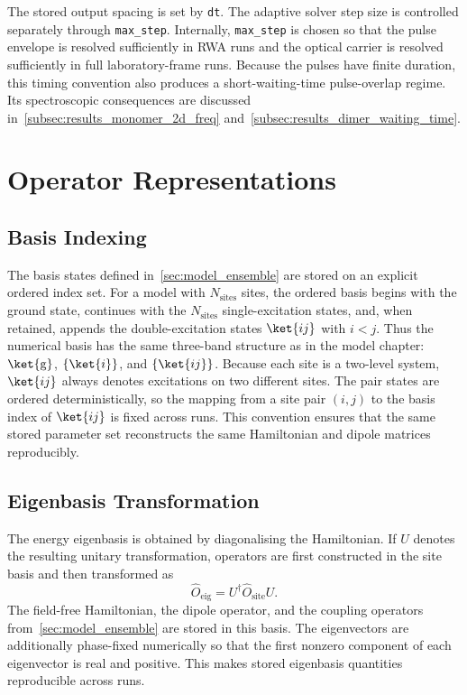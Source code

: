 The stored output spacing is set by \texttt{dt}. The adaptive solver step size
is controlled separately through \texttt{max\_step}. Internally,
\texttt{max\_step} is chosen so that the pulse envelope is resolved
sufficiently in RWA runs and the optical carrier is resolved sufficiently in
full laboratory-frame runs. Because the pulses have finite duration, this
timing convention also produces a short-waiting-time pulse-overlap regime. Its
spectroscopic consequences are discussed
in~\autoref{subsec:results_monomer_2d_freq}
and~\autoref{subsec:results_dimer_waiting_time}.

\section{Operator Representations}
\label{app:sec:model_systems}

\subsection{Basis Indexing}

The basis states defined in~\autoref{sec:model_ensemble} are stored on an
explicit ordered index set. For a model with \(N_{\mathrm{sites}}\) sites, the
ordered basis begins with the ground state, continues with the
\(N_{\mathrm{sites}}\) single-excitation states, and, when retained, appends
the double-excitation states \(\ket{ij}\) with \(i<j\). Thus the numerical
basis has the same three-band structure as in the model chapter:
\(\ket{\mathrm{g}}\), \(\{\ket{i}\}\), and \(\{\ket{ij}\}\). Because each site is a
two-level system, \(\ket{ij}\) always denotes excitations on two different
sites. The pair states are ordered deterministically, so the mapping from a
site pair \((i,j)\) to the basis index of \(\ket{ij}\) is fixed across runs.
This convention ensures that the same stored parameter set reconstructs the
same Hamiltonian and dipole matrices reproducibly.

\subsection{Eigenbasis Transformation}

The energy eigenbasis is obtained by diagonalising the Hamiltonian. If \(U\)
denotes the resulting unitary transformation, operators are first constructed
in the site basis and then transformed as
\[
\hat{O}_{\mathrm{eig}} = U^{\dagger}\hat{O}_{\mathrm{site}}U.
\]
The field-free Hamiltonian, the dipole operator, and the coupling operators
from~\autoref{sec:model_ensemble} are stored in this basis. The eigenvectors
are additionally phase-fixed numerically so that the first nonzero component of
each eigenvector is real and positive. This makes stored eigenbasis quantities
reproducible across runs.

